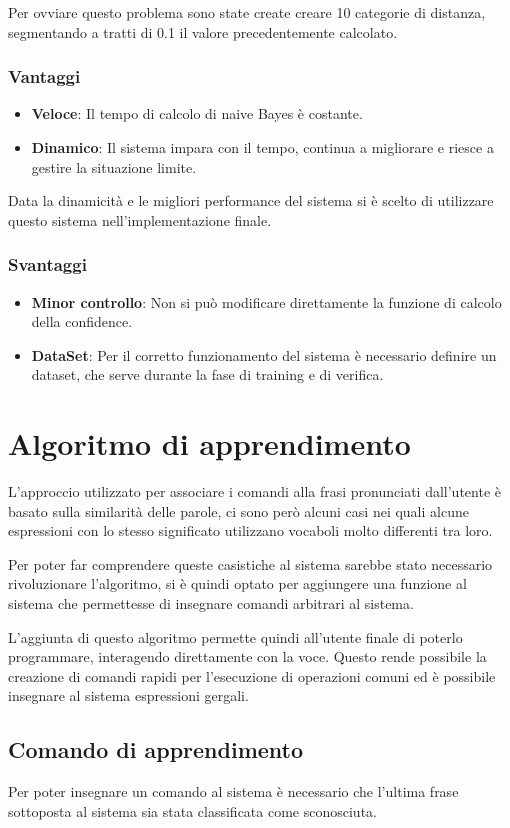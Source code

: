 \documentclass[twoside]{supsistudent}
\begin{document}
Per ovviare questo problema sono state create creare 10 categorie di distanza, segmentando a tratti di 0.1 il valore precedentemente calcolato.
\subsection{Vantaggi}
\begin{itemize}
  \item \textbf{Veloce}: Il tempo di calcolo di naive Bayes è costante.
  \item \textbf{Dinamico}: Il sistema impara con il tempo, continua a migliorare e riesce a gestire la situazione limite.
\end{itemize}
Data la dinamicità e le migliori performance del sistema si è scelto di utilizzare questo sistema nell'implementazione finale.
\subsection{Svantaggi}
\begin{itemize}
  \item \textbf{Minor controllo}: Non si può modificare direttamente la funzione di calcolo della confidence.
  \item \textbf{DataSet}: Per il corretto funzionamento del sistema è necessario definire un dataset, che serve durante la fase di training e di verifica.
\end{itemize}
\chapter{Algoritmo di apprendimento}
L'approccio utilizzato per associare i comandi alla frasi pronunciati dall'utente è basato sulla similarità delle parole, ci sono però alcuni casi nei quali alcune espressioni con lo stesso significato utilizzano vocaboli molto differenti tra loro.

Per poter far comprendere queste casistiche al sistema sarebbe stato necessario rivoluzionare l'algoritmo, si è quindi optato per aggiungere una funzione al sistema che permettesse di insegnare comandi arbitrari al sistema.

L'aggiunta di questo algoritmo permette quindi all'utente finale di poterlo programmare, interagendo direttamente con la voce. Questo rende possibile la creazione di comandi rapidi per l'esecuzione di operazioni comuni ed è possibile insegnare al sistema espressioni gergali.
\section{Comando di apprendimento}
Per poter insegnare un comando al sistema è necessario che l'ultima frase sottoposta al sistema sia stata classificata come sconosciuta. 
\end{document}
